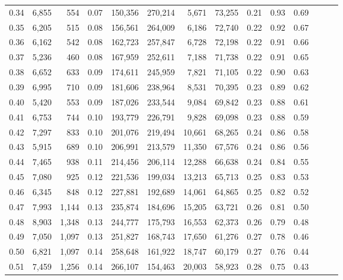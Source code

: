 \begin{tabular}{rrrrrrrrrrrrrr}
0.34 &   6,855 &    554 &  0.07 &  150,356 &  270,214 &   5,671 &  73,255 &  0.21 &  0.93 &      0.69 \\
0.35 &   6,205 &    515 &  0.08 &  156,561 &  264,009 &   6,186 &  72,740 &  0.22 &  0.92 &      0.67 \\
0.36 &   6,162 &    542 &  0.08 &  162,723 &  257,847 &   6,728 &  72,198 &  0.22 &  0.91 &      0.66 \\
0.37 &   5,236 &    460 &  0.08 &  167,959 &  252,611 &   7,188 &  71,738 &  0.22 &  0.91 &      0.65 \\
0.38 &   6,652 &    633 &  0.09 &  174,611 &  245,959 &   7,821 &  71,105 &  0.22 &  0.90 &      0.63 \\
0.39 &   6,995 &    710 &  0.09 &  181,606 &  238,964 &   8,531 &  70,395 &  0.23 &  0.89 &      0.62 \\
0.40 &   5,420 &    553 &  0.09 &  187,026 &  233,544 &   9,084 &  69,842 &  0.23 &  0.88 &      0.61 \\
0.41 &   6,753 &    744 &  0.10 &  193,779 &  226,791 &   9,828 &  69,098 &  0.23 &  0.88 &      0.59 \\
0.42 &   7,297 &    833 &  0.10 &  201,076 &  219,494 &  10,661 &  68,265 &  0.24 &  0.86 &      0.58 \\
0.43 &   5,915 &    689 &  0.10 &  206,991 &  213,579 &  11,350 &  67,576 &  0.24 &  0.86 &      0.56 \\
0.44 &   7,465 &    938 &  0.11 &  214,456 &  206,114 &  12,288 &  66,638 &  0.24 &  0.84 &      0.55 \\
0.45 &   7,080 &    925 &  0.12 &  221,536 &  199,034 &  13,213 &  65,713 &  0.25 &  0.83 &      0.53 \\
0.46 &   6,345 &    848 &  0.12 &  227,881 &  192,689 &  14,061 &  64,865 &  0.25 &  0.82 &      0.52 \\
0.47 &   7,993 &  1,144 &  0.13 &  235,874 &  184,696 &  15,205 &  63,721 &  0.26 &  0.81 &      0.50 \\
0.48 &   8,903 &  1,348 &  0.13 &  244,777 &  175,793 &  16,553 &  62,373 &  0.26 &  0.79 &      0.48 \\
0.49 &   7,050 &  1,097 &  0.13 &  251,827 &  168,743 &  17,650 &  61,276 &  0.27 &  0.78 &      0.46 \\
0.50 &   6,821 &  1,097 &  0.14 &  258,648 &  161,922 &  18,747 &  60,179 &  0.27 &  0.76 &      0.44 \\
0.51 &   7,459 &  1,256 &  0.14 &  266,107 &  154,463 &  20,003 &  58,923 &  0.28 &  0.75 &      0.43 \\

\end{tabular}
